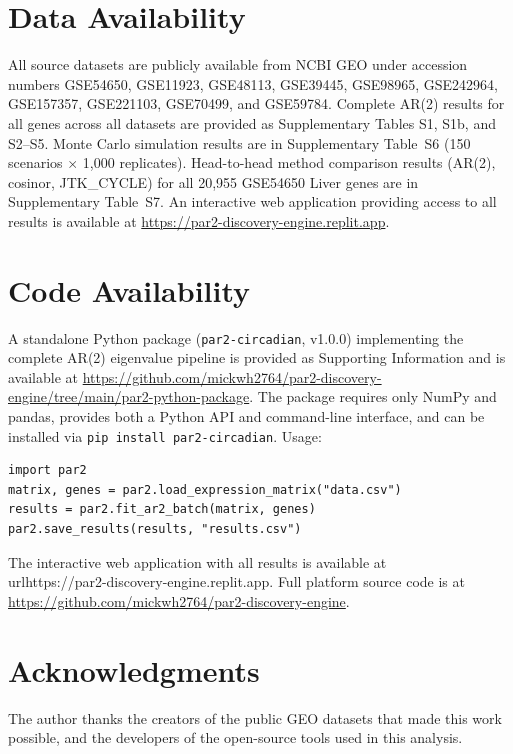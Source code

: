 \documentclass[11pt,letterpaper]{article}
\begin{document}
\section{Data Availability}

All source datasets are publicly available from NCBI GEO \citep{barrett2013ncbi} under accession numbers GSE54650, GSE11923, GSE48113, GSE39445, GSE98965, GSE242964, GSE157357, GSE221103, GSE70499, and GSE59784. Complete AR(2) results for all genes across all datasets are provided as Supplementary Tables S1, S1b, and S2--S5. Monte Carlo simulation results are in Supplementary Table~S6 (150 scenarios $\times$ 1,000 replicates). Head-to-head method comparison results (AR(2), cosinor, JTK\_CYCLE) for all 20,955 GSE54650 Liver genes are in Supplementary Table~S7. An interactive web application providing access to all results is available at \url{https://par2-discovery-engine.replit.app}.

\section{Code Availability}

A standalone Python package (\texttt{par2-circadian}, v1.0.0) implementing the complete AR(2) eigenvalue pipeline is provided as Supporting Information and is available at \url{https://github.com/mickwh2764/par2-discovery-engine/tree/main/par2-python-package}. The package requires only NumPy and pandas, provides both a Python API and command-line interface, and can be installed via \texttt{pip install par2-circadian}. Usage:

\begin{verbatim}
import par2
matrix, genes = par2.load_expression_matrix("data.csv")
results = par2.fit_ar2_batch(matrix, genes)
par2.save_results(results, "results.csv")
\end{verbatim}

The interactive web application with all results is available at \\url{https://par2-discovery-engine.replit.app}. Full platform source code is at \url{https://github.com/mickwh2764/par2-discovery-engine}.

\section*{Acknowledgments}

The author thanks the creators of the public GEO datasets that made this work possible, and the developers of the open-source tools used in this analysis.
\end{document}
